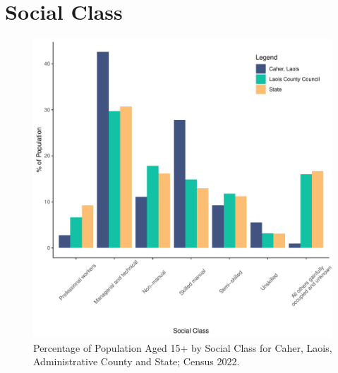 \documentclass{article}
\begin{document}
\section{Social Class}\label{sect:SC}
\begin{figure}[H]
	\centering
	\includegraphics[width = 140mm]{../figures/SocialClassED.pdf}
	\caption{Percentage of Population Aged 15+ by Social Class for Caher, Laois, Administrative County and State; Census 2022.}
	\label{fig:vbnv}
	\end{figure}
\end{document}
